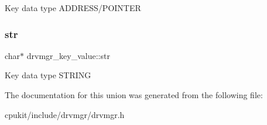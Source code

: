 Key data type A\+D\+D\+R\+E\+S\+S/\+P\+O\+I\+N\+T\+ER \mbox{\label{uniondrvmgr__key__value_a57c138322a3ff8824f70c1973c3561e9}} 
\subsubsection{\texorpdfstring{str}{str}}
{\footnotesize\ttfamily char$\ast$ drvmgr\+\_\+key\+\_\+value\+::str}

Key data type S\+T\+R\+I\+NG 

The documentation for this union was generated from the following file\+:\begin{DoxyCompactItemize}
\item 
cpukit/include/drvmgr/drvmgr.\+h\end{DoxyCompactItemize}
